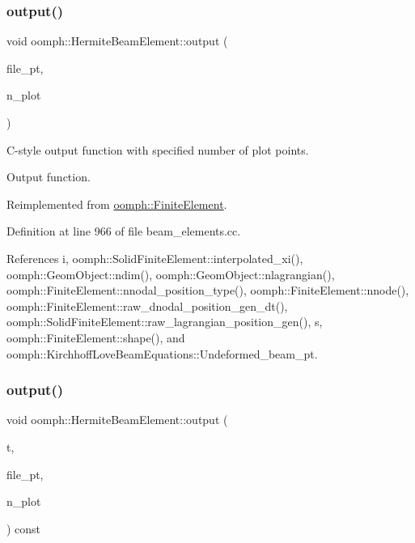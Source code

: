 \subsubsection{\texorpdfstring{output()}{output()}\hspace{0.1cm}{\footnotesize\ttfamily [5/6]}}
{\footnotesize\ttfamily void oomph\+::\+Hermite\+Beam\+Element\+::output (\begin{DoxyParamCaption}\item[{F\+I\+LE $\ast$}]{file\+\_\+pt,  }\item[{const unsigned \&}]{n\+\_\+plot }\end{DoxyParamCaption})\hspace{0.3cm}{\ttfamily [virtual]}}



C-\/style output function with specified number of plot points. 

Output function. 

Reimplemented from \hyperlink{classoomph_1_1FiniteElement_adfaee690bb0608f03320eeb9d110d48c}{oomph\+::\+Finite\+Element}.



Definition at line 966 of file beam\+\_\+elements.\+cc.



References i, oomph\+::\+Solid\+Finite\+Element\+::interpolated\+\_\+xi(), oomph\+::\+Geom\+Object\+::ndim(), oomph\+::\+Geom\+Object\+::nlagrangian(), oomph\+::\+Finite\+Element\+::nnodal\+\_\+position\+\_\+type(), oomph\+::\+Finite\+Element\+::nnode(), oomph\+::\+Finite\+Element\+::raw\+\_\+dnodal\+\_\+position\+\_\+gen\+\_\+dt(), oomph\+::\+Solid\+Finite\+Element\+::raw\+\_\+lagrangian\+\_\+position\+\_\+gen(), s, oomph\+::\+Finite\+Element\+::shape(), and oomph\+::\+Kirchhoff\+Love\+Beam\+Equations\+::\+Undeformed\+\_\+beam\+\_\+pt.

\mbox{\label{classoomph_1_1HermiteBeamElement_afc92c0d3a0b5ca4bbd4c6232e6858a8a}} 
\subsubsection{\texorpdfstring{output()}{output()}\hspace{0.1cm}{\footnotesize\ttfamily [6/6]}}
{\footnotesize\ttfamily void oomph\+::\+Hermite\+Beam\+Element\+::output (\begin{DoxyParamCaption}\item[{const unsigned \&}]{t,  }\item[{F\+I\+LE $\ast$}]{file\+\_\+pt,  }\item[{const unsigned \&}]{n\+\_\+plot }\end{DoxyParamCaption}) const}



